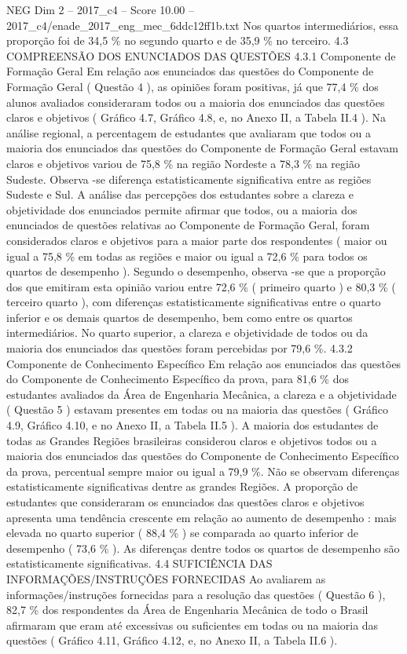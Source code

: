 \begin{textsample}{NEG Dim 2 – 2017\_c4 – Score 10.00 – 2017\_c4/enade\_2017\_eng\_mec\_6ddc12ff1b.txt}
Nos quartos intermediários, essa proporção foi de 34,5 \% no segundo quarto e de 35,9 \% no terceiro. 4.3 COMPREENSÃO DOS ENUNCIADOS DAS QUESTÕES 4.3.1 Componente de Formação Geral Em relação aos enunciados das questões do Componente de Formação Geral ( Questão 4 ), as opiniões foram positivas, já que 77,4 \% dos alunos avaliados consideraram todos ou a maioria dos enunciados das questões claros e objetivos ( Gráfico 4.7, Gráfico 4.8, e, no Anexo II, a Tabela II.4 ).
Na análise regional, a percentagem de estudantes que avaliaram que todos ou a maioria dos enunciados das questões do Componente de Formação Geral estavam claros e objetivos variou de 75,8 \% na região Nordeste a 78,3 \% na região Sudeste.
Observa -se diferença estatisticamente significativa entre as regiões Sudeste e Sul.
A análise das percepções dos estudantes sobre a clareza e objetividade dos enunciados permite afirmar que todos, ou a maioria dos enunciados de questões relativas ao Componente de Formação Geral, foram considerados claros e objetivos para a maior parte dos respondentes ( maior ou igual a 75,8 \% em todas as regiões e maior ou igual a 72,6 \% para todos os quartos de desempenho ).
Segundo o desempenho, observa -se que a proporção dos que emitiram esta opinião variou entre 72,6 \% ( primeiro quarto ) e 80,3 \% ( terceiro quarto ), com diferenças estatisticamente significativas entre o quarto inferior e os demais quartos de desempenho, bem como entre os quartos intermediários.
No quarto superior, a clareza e objetividade de todos ou da maioria dos enunciados das questões foram percebidas por 79,6 \%. 4.3.2 Componente de Conhecimento Específico Em relação aos enunciados das questões do Componente de Conhecimento Específico da prova, para 81,6 \% dos estudantes avaliados da Área de Engenharia Mecânica, a clareza e a objetividade ( Questão 5 ) estavam presentes em todas ou na maioria das questões ( Gráfico 4.9, Gráfico 4.10, e no Anexo II, a Tabela II.5 ).
A maioria dos estudantes de todas as Grandes Regiões brasileiras considerou claros e objetivos todos ou a maioria dos enunciados das questões do Componente de Conhecimento Específico da prova, percentual sempre maior ou igual a 79,9 \%.
Não se observam diferenças estatisticamente significativas dentre as grandes Regiões.
A proporção de estudantes que consideraram os enunciados das questões claros e objetivos apresenta uma tendência crescente em relação ao aumento de desempenho : mais elevada no quarto superior ( 88,4 \% ) se comparada ao quarto inferior de desempenho ( 73,6 \% ).
As diferenças dentre todos os quartos de desempenho são estatisticamente significativas. 4.4 SUFICIÊNCIA DAS INFORMAÇÕES/INSTRUÇÕES FORNECIDAS Ao avaliarem as informações/instruções fornecidas para a resolução das questões ( Questão 6 ), 82,7 \% dos respondentes da Área de Engenharia Mecânica de todo o Brasil afirmaram que eram até excessivas ou suficientes em todas ou na maioria das questões ( Gráfico 4.11, Gráfico 4.12, e, no Anexo II, a Tabela II.6 ).

\end{textsample}
